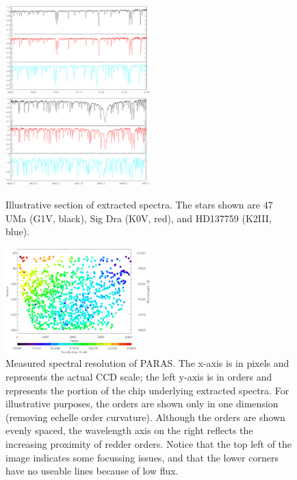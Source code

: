 \documentclass[12pt,preprint]{emulateapj}
\begin{document}
\begin{figure}[htbp] %
   \centering
   \includegraphics[width=0.5\textwidth]{3stars_paper_1_47uma_sigdra_hd137759.eps} 
   \includegraphics[width=0.5\textwidth]{3stars_paper_2_47uma_sigdra_hd137759.eps} 
    \caption{Illustrative section of extracted spectra. The stars shown are 47 UMa (G1V, black),
     Sig Dra (K0V, red), and HD137759 (K2III, blue).}
   \label{fig:3stars}
\end{figure}

\begin{figure}[htbp] %
   \centering
   \includegraphics[width=0.5\textwidth]{resolution_paper.eps} 
      \vspace{10pt}
       \caption{Measured spectral resolution of PARAS. The x-axis is in pixels and represents the actual
    CCD scale; the left y-axis is in orders and represents the portion of the chip underlying extracted spectra. 
    For illustrative purposes, the orders are shown only in one dimension (removing echelle order curvature). 
    Although the orders are shown evenly spaced, the wavelength axis on the right reflects the increasing
    proximity of redder orders. Notice that the top left of the image indicates some focussing issues, and that the
    lower corners have no useable lines because of low flux.
    }

   \label{fig:res}
\end{figure}
\end{document}
